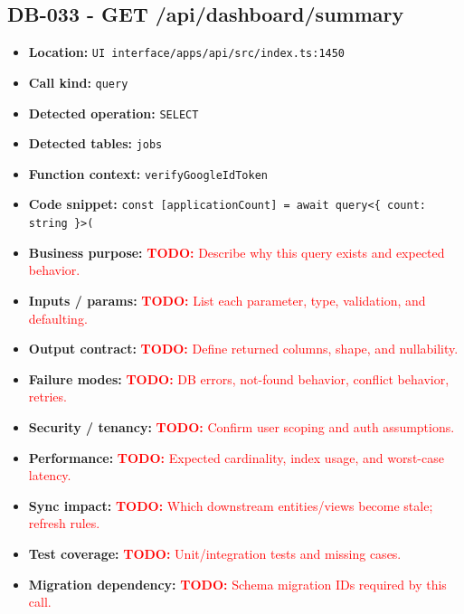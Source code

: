\documentclass[11pt]{article}
\newcommand{\todoitem}[1]{\textcolor{red}{\textbf{TODO:} #1}}
\begin{document}
\subsection{DB-033 - GET /api/dashboard/summary}
\begin{itemize}[leftmargin=1.5em]
\item \textbf{Location:} \texttt{UI interface/apps/api/src/index.ts:1450}
\item \textbf{Call kind:} \texttt{query}
\item \textbf{Detected operation:} \texttt{SELECT}
\item \textbf{Detected tables:} \texttt{jobs}
\item \textbf{Function context:} \texttt{verifyGoogleIdToken}
\item \textbf{Code snippet:} \texttt{const [applicationCount] = await query<\{ count: string \}>(}
\item \textbf{Business purpose:} \todoitem{Describe why this query exists and expected behavior.}
\item \textbf{Inputs / params:} \todoitem{List each parameter, type, validation, and defaulting.}
\item \textbf{Output contract:} \todoitem{Define returned columns, shape, and nullability.}
\item \textbf{Failure modes:} \todoitem{DB errors, not-found behavior, conflict behavior, retries.}
\item \textbf{Security / tenancy:} \todoitem{Confirm user scoping and auth assumptions.}
\item \textbf{Performance:} \todoitem{Expected cardinality, index usage, and worst-case latency.}
\item \textbf{Sync impact:} \todoitem{Which downstream entities/views become stale; refresh rules.}
\item \textbf{Test coverage:} \todoitem{Unit/integration tests and missing cases.}
\item \textbf{Migration dependency:} \todoitem{Schema migration IDs required by this call.}
\end{itemize}
\end{document}
